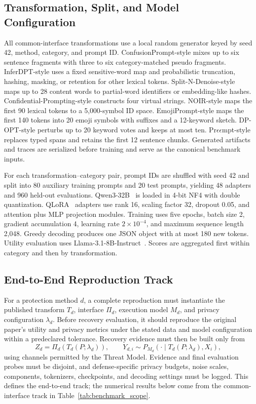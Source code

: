 \documentclass[letterpaper]{article} %
\begin{document}
\subsection{Transformation, Split, and Model Configuration}

All common-interface transformations use a local random generator keyed by seed 42, method, category, and prompt ID.  ConfusionPrompt-style mixes up to six sentence fragments with three to six category-matched pseudo fragments.  InferDPT-style uses a fixed sensitive-word map and probabilistic truncation, hashing, masking, or retention for other lexical tokens.  Split-N-Denoise-style maps up to 28 content words to partial-word identifiers or embedding-like hashes.  Confidential-Prompting-style constructs four virtual strings.  NOIR-style maps the first 90 lexical tokens to a 5,000-symbol ID space.  EmojiPrompt-style maps the first 140 tokens into 20 emoji symbols with suffixes and a 12-keyword sketch.  DP-OPT-style perturbs up to 20 keyword votes and keeps at most ten.  Pr$\epsilon\epsilon$mpt-style replaces typed spans and retains the first 12 sentence chunks.  Generated artifacts and traces are serialized before training and serve as the canonical benchmark inputs.

For each transformation--category pair, prompt IDs are shuffled with seed 42 and split into 80 auxiliary training prompts and 20 test prompts, yielding 48 adapters and 960 held-out evaluations.  Qwen3-32B~\citep{yang2025qwen3} is loaded in 4-bit NF4 with double quantization.  QLoRA~\citep{dettmers2023qlora} adapters use rank 16, scaling factor 32, dropout 0.05, and attention plus MLP projection modules.  Training uses five epochs, batch size 2, gradient accumulation 4, learning rate \(2\times10^{-4}\), and maximum sequence length 2,048.  Greedy decoding produces one JSON object with at most 180 new tokens.  Utility evaluation uses Llama-3.1-8B-Instruct~\citep{grattafiori2024llama3}.  Scores are aggregated first within category and then by transformation.

\subsection{End-to-End Reproduction Track}

For a protection method \(d\), a complete reproduction must instantiate the published transform \(T_d\), interface \(\Pi_d\), execution model \(M_d\), and privacy configuration \(\lambda_d\).  Before recovery evaluation, it should reproduce the original paper's utility and privacy metrics under the stated data and model configuration within a predeclared tolerance.  Recovery evidence must then be built only from
\[
Z_d=\Pi_d(T_d(P;\lambda_d)),\qquad
Y_{d,i}\sim P_{M_d}(\cdot\mid T_d(P;\lambda_d),X_i),
\]
using channels permitted by the Threat Model.  Evidence and final evaluation probes must be disjoint, and defense-specific privacy budgets, noise scales, components, tokenizers, checkpoints, and decoding settings must be logged.  This defines the end-to-end track; the numerical results below come from the common-interface track in Table~\ref{tab:benchmark_scope}.
\end{document}
